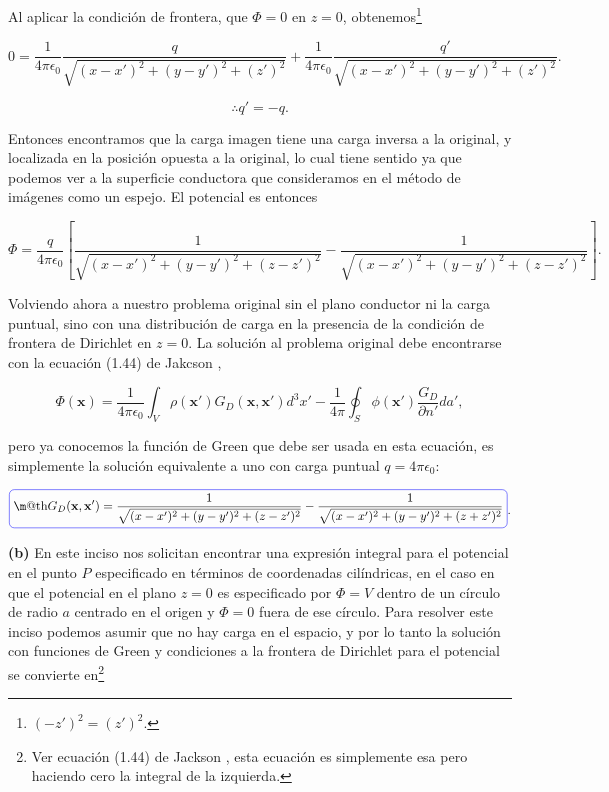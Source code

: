 \documentclass[a4paper,11pt]{article}
\makeatletter
\numberwithin{equation}{section}
\newcommand*{\boxcolor}{blue}
\renewcommand{\boxed}[1]{\textcolor{\boxcolor}{%
\tikz[baseline={([yshift=-1ex]current bounding box.center)}] \node [rectangle, minimum width=1ex,rounded corners,draw] {\normalcolor\m@th$\displaystyle#1$};}}
\makeatother
\begin{document}
Al aplicar la condición de frontera, que $\Phi = 0$ en $z = 0$, obtenemos\footnote{
$(-z')^2 = (z')^2$.}

\begin{equation}
  0 = \frac{1}{4\pi\epsilon_0}\frac{q}{\sqrt{(x-x')^2 + (y-y')^2 + (z')^2}} + 
 \frac{1}{4\pi\epsilon_0}\frac{q'}{\sqrt{(x-x')^2 + (y-y')^2 + (z')^2}}.
\end{equation}

\begin{equation}
 \therefore q' = -q.
\end{equation}

Entonces encontramos que la carga imagen tiene una carga inversa a la original, y 
localizada en la posición opuesta a la original, lo cual tiene sentido ya que podemos 
ver a la superficie conductora que consideramos en el método de imágenes como un 
espejo. El potencial es entonces 

\begin{equation*}
  \Phi = \frac{q}{4\pi\epsilon_0}\left[\frac{1}{\sqrt{(x-x')^2 + (y-y')^2 + (z-z')^2}} - 
 \frac{1}{\sqrt{(x-x')^2 + (y-y')^2 + (z-z')^2}}\right].
\end{equation*}

Volviendo ahora a nuestro problema original sin el plano conductor ni la carga 
puntual, sino con una distribución de carga en la presencia de la condición de 
frontera de Dirichlet en $z=0$. La solución al problema original debe encontrarse 
con la ecuación (1.44) de Jakcson \cite{jackson3}, 

\begin{equation}
 \Phi(\mathbf{x}) = \frac{1}{4\pi\epsilon_0} \int_V \rho(\mathbf{x}')G_D(\mathbf{x},
 \mathbf{x}')d^3x' - \frac{1}{4\pi}\oint_S \phi(\mathbf{x}')\frac{G_D}{\partial n'}da',
\end{equation}

pero ya conocemos la función de Green que debe ser usada en esta ecuación, es simplemente 
la solución equivalente a uno con carga puntual $q = 4\pi\epsilon_0$: 

\begin{equation*}
 \boxed{G_D(\mathbf{x},\mathbf{x}') = \frac{1}{\sqrt{(x-x')^2 + (y-y')^2 + (z-z')^2}} - 
 \frac{1}{\sqrt{(x-x')^2 + (y-y')^2 + (z+z')^2}}}.
\end{equation*}

\textbf{(b)} En este inciso nos solicitan encontrar una expresión integral para 
el potencial en el punto $P$ especificado en términos de coordenadas cilíndricas, en 
el caso en que el potencial en el plano $z=0$ es especificado por $\Phi = V$ dentro 
de un círculo de radio $a$ centrado en el origen y $\Phi = 0$ fuera de ese círculo. 
Para resolver este inciso podemos asumir que no hay carga en el espacio, y por lo tanto 
la solución con funciones de Green y condiciones a la frontera de Dirichlet para 
el potencial se convierte en\footnote{Ver ecuación (1.44) de Jackson \cite{jackson3}, 
esta ecuación es simplemente esa pero haciendo cero la integral de la izquierda.}
\end{document}
